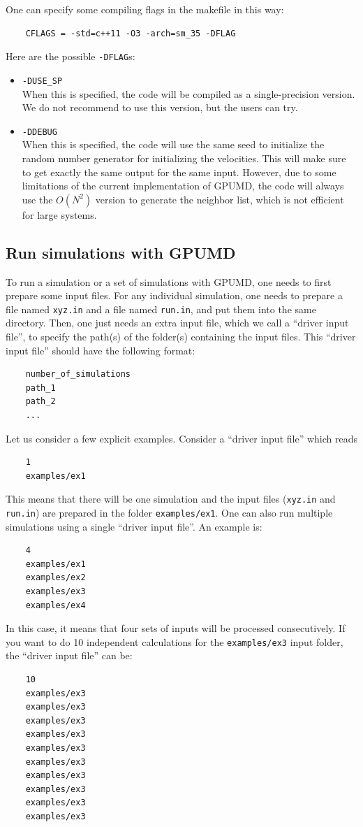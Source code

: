 \documentclass[12pt,a4paper]{report}
\begin{document}
One can specify some compiling flags in the makefile in this way:
\begin{verbatim}
    CFLAGS = -std=c++11 -O3 -arch=sm_35 -DFLAG
\end{verbatim}
Here are the possible \verb"-DFLAG"s:
\begin{itemize}
\item \verb"-DUSE_SP"\\
When this is specified, the code will be compiled as a single-precision version. We do not recommend to use this version, but the users can try.
\item \verb"-DDEBUG"\\
When this is specified, the code will use the same seed to initialize the random number generator for initializing the velocities. This will make sure to get exactly the same output for the same input. However, due to some limitations of the current implementation of GPUMD, the code will always use the $O(N^2)$ version to generate the neighbor list, which is not efficient for large systems. 
\end{itemize}


\subsection{Run simulations with GPUMD}

To run a simulation or a set of simulations with GPUMD, one needs to first prepare some input files. For any individual simulation, one needs to prepare a file named \verb"xyz.in" and a file named \verb"run.in", and put them into the same directory. Then, one just needs an extra input file, which we call a ``driver input file'', to specify the path(s) of the folder(s) containing the input files. This ``driver input file'' should have the following format:
\begin{verbatim}
    number_of_simulations
    path_1
    path_2
    ...
\end{verbatim}


Let us consider a few explicit examples. Consider a ``driver input file'' which reads
\begin{verbatim}
    1
    examples/ex1
\end{verbatim}
This means that there will be one simulation and the input files (\verb"xyz.in" and \verb"run.in") are prepared in the folder \verb"examples/ex1". One can also run multiple simulations using a single ``driver input file''. An example is:
\begin{verbatim}
    4
    examples/ex1
    examples/ex2
    examples/ex3
    examples/ex4
\end{verbatim}
In this case, it means that four sets of inputs will be processed consecutively. If you want to do 10 independent calculations for the \verb"examples/ex3" input folder, the ``driver input file'' can be:
\begin{verbatim}
    10
    examples/ex3
    examples/ex3
    examples/ex3
    examples/ex3
    examples/ex3
    examples/ex3
    examples/ex3
    examples/ex3
    examples/ex3
    examples/ex3
\end{verbatim}
\end{document}
